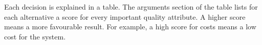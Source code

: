 Each decision is explained in a table. The arguments section of the table lists for each alternative a score for every important quality attribute.
A higher score means a more favourable result. For example, a high score for costs means a low cost for the system.
\\[1.0cm]


